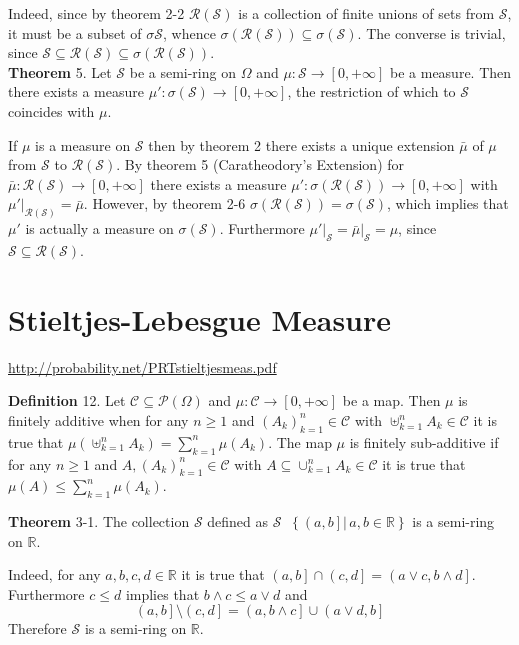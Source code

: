\documentclass[a4paper]{article}
\newcommand{\obj}[1]{\left\{ #1 \right \}}
\newcommand{\clo}[1]{\left [ #1 \right ]}
\newcommand{\ploc}[1]{\left ( #1 \right ]}
\newcommand{\brac}[1]{\left ( #1 \right )}
\newcommand{\induc}[1]{\left . #1 \right \vert}
\newcommand{\Real}{\mathbb{R}}
\newcommand{\Zinf}{\clo{ 0, +\infty }}
\newcommand{\Ccal}{\mathcal{C}}
\newcommand{\Scal}{\mathcal{S}}
\newcommand{\pwr}[1]{\mathcal{P}\brac{#1}}
\newcommand{\Ring}[1]{\mathcal{R}\brac{#1}}
\newcommand{\defn}{\mathop{\overset{\Delta}{=}}\nolimits}
\begin{document}
Indeed, since by theorem 2-2 $\Ring{\Scal}$ is a collection of finite unions of sets from $\Scal$, it must be a subset of $\sigma{\Scal}$, whence $\sigma\brac{\Ring{\Scal}}\subseteq\sigma\brac{\Scal}$. The converse is trivial, since $\Scal\subseteq\Ring{\Scal}\subseteq\sigma\brac{\Ring{\Scal}}$.\\

\label{thm:caratheodory2} \noindent \textbf{Theorem} 5.
Let $\Scal$ be a semi-ring on $\Omega$ and $\mu:\Scal\to \Zinf$ be a measure. Then there exists a measure $\mu':\sigma\brac{\Scal}\to \Zinf$, the restriction of which to $\Scal$ coincides with $\mu$.

If $\mu$ is a measure on $\Scal$ then by theorem 2 there exists a unique extension $\bar{\mu}$ of $\mu$ from $\Scal$ to $\Ring{\Scal}$. By theorem 5 (Caratheodory's Extension) for $\bar{\mu}:\Ring{\Scal}\to \Zinf$ there exists a measure $\mu':\sigma\brac{\Ring{\Scal}}\to\Zinf$ with $\induc{\mu'}_{\Ring{\Scal}}=\bar{\mu}$. However, by theorem 2-6 $\sigma\brac{\Ring{\Scal}}=\sigma\brac{\Scal}$, which implies that $\mu'$ is actually a measure on $\sigma\brac{\Scal}$. Furthermore $\induc{\mu'}_\Scal = \induc{\bar{\mu}}_\Scal = \mu$, since $\Scal\subseteq\Ring{\Scal}$.\\


\section{Stieltjes-Lebesgue Measure} %
\label{sec:tut_3}
\url{http://probability.net/PRTstieltjesmeas.pdf}

\noindent \textbf{Definition} 12.
Let $\Ccal\subseteq \pwr{\Omega}$ and $\mu:\Ccal\to \Zinf$ be a map. Then $\mu$ is finitely additive when for any $n\geq1$ and $\brac{A_k}_{k=1}^n\in \Ccal$ with $\uplus_{k=1}^n A_k\in \Ccal$ it is true that $\mu\brac{\uplus_{k=1}^n A_k}=\sum_{k=1}^n \mu\brac{A_k}$. The map $\mu$ is finitely sub-additive if for any $n\geq1$ and $A,\brac{A_k}_{k=1}^n\in \Ccal$ with $A\subseteq \cup_{k=1}^n A_k\in \Ccal$ it is true that $\mu\brac{A}\leq \sum_{k=1}^n \mu\brac{A_k}$.

\label{thm:half_open_inetrvals} \noindent \textbf{Theorem} 3-1.
The collection $\Scal$ defined as $\Scal \defn \obj{\induc{\ploc{a,b}}\,a,b\in \Real}$ is a semi-ring on $\Real$.

Indeed, for any $a,b,c,d\in \Real$ it is true that $\ploc{a,b}\cap\ploc{c,d} = \ploc{a\vee c, b\wedge d}$. Furthermore $c\leq d$ implies that $b\wedge c\leq a\vee d$ and \[\ploc{a,b}\setminus\ploc{c,d} = \ploc{a,b\wedge c}\cup \ploc{a\vee d,b}\] Therefore $\Scal$ is a semi-ring on $\Real$.\\
\end{document}
